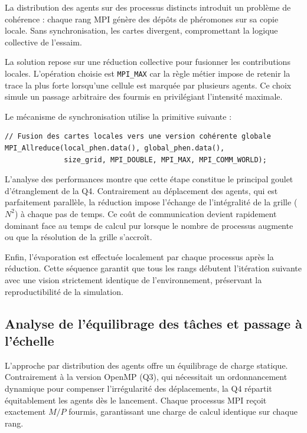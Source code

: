 \documentclass[11pt,a4paper]{article}
\begin{document}
La distribution des agents sur des processus distincts introduit un problème de cohérence : chaque rang MPI génère des dépôts de phéromones sur sa copie locale. Sans synchronisation, les cartes divergent, compromettant la logique collective de l'essaim.

La solution repose sur une réduction collective pour fusionner les contributions locales. L'opération choisie est \texttt{MPI\_MAX} car la règle métier impose de retenir la trace la plus forte lorsqu'une cellule est marquée par plusieurs agents. Ce choix simule un passage arbitraire des fourmis en privilégiant l'intensité maximale.

Le mécanisme de synchronisation utilise la primitive suivante :

\begin{verbatim}
// Fusion des cartes locales vers une version cohérente globale
MPI_Allreduce(local_phen.data(), global_phen.data(),
              size_grid, MPI_DOUBLE, MPI_MAX, MPI_COMM_WORLD);
\end{verbatim}


L'analyse des performances montre que cette étape constitue le principal goulet d'étranglement de la Q4. Contrairement au déplacement des agents, qui est parfaitement parallèle, la réduction impose l'échange de l'intégralité de la grille ($N^2$) à chaque pas de temps. Ce coût de communication devient rapidement dominant face au temps de calcul pur lorsque le nombre de processus augmente ou que la résolution de la grille s'accroît.

Enfin, l'évaporation est effectuée localement par chaque processus après la réduction. Cette séquence garantit que tous les rangs débutent l'itération suivante avec une vision strictement identique de l'environnement, préservant la reproductibilité de la simulation.



\subsection{Analyse de l'équilibrage des tâches et passage à l'échelle}

L'approche par distribution des agents offre un équilibrage de charge statique. Contrairement à la version OpenMP (Q3), qui nécessitait un ordonnancement dynamique pour compenser l'irrégularité des déplacements, la Q4 répartit équitablement les agents dès le lancement. Chaque processus MPI reçoit exactement $M/P$ fourmis, garantissant une charge de calcul identique sur chaque rang.
\end{document}
